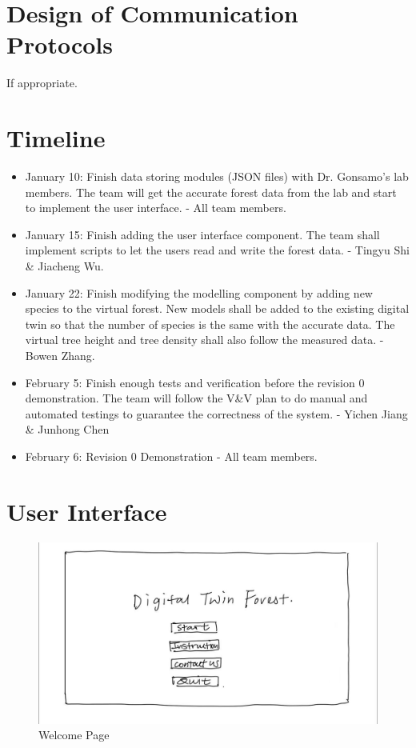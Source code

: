 \documentclass[12pt, titlepage]{article}
\begin{document}
\section{Design of Communication Protocols}

If appropriate.

\section{Timeline}
\begin{itemize}
    \item January 10: Finish data storing modules (JSON files) with Dr. Gonsamo's lab members. The team will get the accurate forest data from the lab and start to implement the user interface. - All team members.
    \item January 15: Finish adding the user interface component. The team shall implement scripts to let the users read and write the forest data. - Tingyu Shi \& Jiacheng Wu.
    \item January 22: Finish modifying the modelling component by adding new species to the virtual forest. New models shall be added to the existing digital twin so that the number of species is the same with the accurate data. The virtual tree height and tree density shall also follow the measured data. - Bowen Zhang.
    \item February 5: Finish enough tests and verification before the revision 0 demonstration. The team will follow the V\&V plan to do manual and automated testings to guarantee the correctness of the system. - Yichen Jiang \& Junhong Chen
    \item February 6: Revision 0 Demonstration - All team members.
\end{itemize}
% 

\newpage{}

\appendix

\section{User Interface}

\begin{figure}[H]
    \centering
    \includegraphics[scale=0.3]{SysDesPic/AppendixA-1.jpeg}
    \caption{Welcome Page}
\end{figure}
\end{document}
